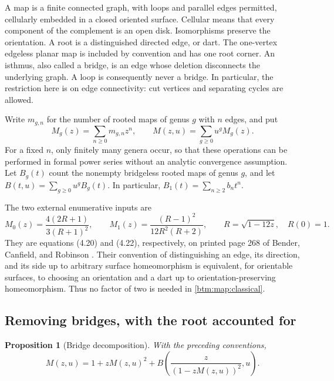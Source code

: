 \documentclass[11pt,letterpaper]{article}
\numberwithin{equation}{section}
\newtheorem{proposition}[theorem]{Proposition}
\theoremstyle{definition}
\theoremstyle{remark}
\begin{document}
A map is a finite connected graph, with loops and parallel edges permitted,
cellularly embedded in a closed oriented surface.  Cellular means that
every component of the complement is an open disk.  Isomorphisms preserve
the orientation.  A root is a distinguished directed edge, or dart.  The
one-vertex edgeless planar map is included by convention and has one root
corner.  An isthmus, also called a bridge, is an edge whose deletion
disconnects the underlying graph.  A loop is consequently never a bridge.
In particular, the restriction here is on edge connectivity: cut vertices
and separating cycles are allowed.

Write $m_{g,n}$ for the number of rooted maps of genus $g$ with $n$ edges,
and put
\[
 M_g(z)=\sum_{n\geq0}m_{g,n}z^n,
 \qquad M(z,u)=\sum_{g\geq0}u^gM_g(z).
\]
For a fixed $n$, only finitely many genera occur, so that these operations
can be performed in formal power series without an analytic convergence
assumption.  Let $B_g(t)$ count the nonempty bridgeless rooted maps of genus
$g$, and let $B(t,u)=\sum_{g\geq0}u^gB_g(t)$.  In particular,
$B_1(t)=\sum_{n\geq2}b_n t^n$.

The two external enumerative inputs are
\begin{equation}
 \label{btm:map:classical}
 M_0(z)=\frac{4(2R+1)}{3(R+1)^2},\qquad
 M_1(z)=\frac{(R-1)^2}{12R^2(R+2)},\qquad
 R=\sqrt{1-12z},\quad R(0)=1.
\end{equation}
They are equations (4.20) and (4.22), respectively, on printed page 268
of Bender, Canfield, and Robinson \cite{map:bcr1988}.  Their convention of
distinguishing an edge, its direction, and its side up to arbitrary
surface homeomorphism is equivalent, for orientable surfaces, to choosing
an orientation and a dart up to orientation-preserving homeomorphism.
Thus no factor of two is needed in \eqref{btm:map:classical}.

\subsection{Removing bridges, with the root accounted for}
\label{btm:map:bridges}

\begin{proposition}[Bridge decomposition]
 \label{btm:map:decomposition}
 With the preceding conventions,
 \begin{equation}
  \label{btm:map:master}
  M(z,u)=1+zM(z,u)^2+
  B\!\left(\frac{z}{(1-zM(z,u))^2},u\right).
 \end{equation}
\end{proposition}
\end{document}
